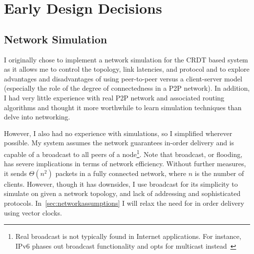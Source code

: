 \documentclass[12pt,a4paper,twoside,openright]{report}
\begin{document}
	
\section{Early Design Decisions}

	\subsection{Network Simulation}
	
	I originally chose to implement a network simulation for the CRDT based system as it allows me to control the topology, link latencies, and protocol and to explore advantages and disadvantages of using peer-to-peer versus a client-server model (especially the role of the degree of connectedness in a P2P network). In addition, I had very little experience with real P2P network and associated routing algorithms and thought it more worthwhile to learn simulation techniques than delve into networking.
	
	However, I also had no experience with simulations, so I simplified wherever possible. My system assumes the network guarantees in-order delivery and is capable of a broadcast to all peers of a node\footnote{Real broadcast is not typically found in Internet applications. For instance, IPv6 phases out broadcast functionality and opts for multicast instead~\cite{RFC2460}}. Note that broadcast, or flooding, has severe implications in terms of network efficiency. Without further measures, it sends $\Theta (n^{2})$ packets in a fully connected network, where $n$ is the number of clients. However, though it has downsides, I use broadcast for its simplicity to simulate on given a network topology, and lack of addressing and sophisticated protocols. In~\cref{sec:networkassumptions} I will relax the need for in order delivery using vector clocks.
	
	
	
\end{document}
